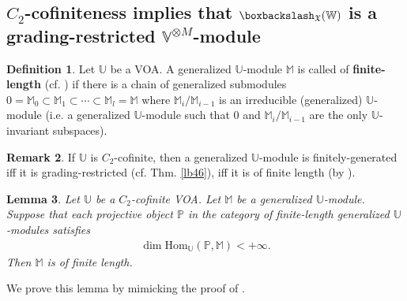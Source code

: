 \documentclass[11pt,b5paper,notitlepage]{article}
\theoremstyle{definition}
\newtheorem{df}{Definition}[section]
\newtheorem{rem}[df]{Remark}
\theoremstyle{plain}
\newtheorem{lm}[df]{Lemma}
\newcommand{\fk}{\mathfrak}
\newcommand{\Hom}{\mathrm{Hom}}
\newcommand{\Vbb}{\mathbb V}
\newcommand{\Ubb}{\mathbb U}
\newcommand{\Wbb}{\mathbb W}
\newcommand{\Mbb}{\mathbb M}
\newcommand{\Pbb}{\mathbb P}
\newcommand{\<}{\left\langle}
\renewcommand{\>}{\right\rangle}
\newcommand{\bbs}{\boxbackslash}
\numberwithin{equation}{section}
\begin{document}
\subsection{$C_2$-cofiniteness implies that $\bbs_{\fk X}(\Wbb)$ is a grading-restricted $\Vbb^{\otimes M}$-module}





\begin{df}
Let $\Ubb$ be a VOA. A generalized $\Ubb$-module $\Mbb$ is called of \textbf{finite-length} (cf. \cite[Def. 1.2]{Hua-projectivecover}) if there is a chain of generalized submodules $0=\Mbb_0\subset\Mbb_1\subset\cdots\subset\Mbb_l=\Mbb$ where $\Mbb_i/\Mbb_{i-1}$ is an irreducible (generalized) $\Ubb$-module (i.e. a generalized $\Ubb$-module such that $0$ and $\Mbb_i/\Mbb_{i-1}$ are the only $\Ubb$-invariant subspaces). %
\end{df}


\begin{rem}
If $\Ubb$ is $C_2$-cofinite, then a generalized $\Ubb$-module is finitely-generated iff it is grading-restricted (cf. Thm. \ref{lb46}), iff it is of finite length (by \cite[Prop. 4.3]{Hua-projectivecover}).
\end{rem}

\begin{lm}\label{lb54}
Let $\Ubb$ be a $C_2$-cofinite VOA. Let $\Mbb$ be a generalized $\Ubb$-module. Suppose that each projective object $\Pbb$ in the category of finite-length generalized $\Ubb$-modules satisfies
\begin{align*}
\dim \Hom_\Ubb(\Pbb,\Mbb)<+\infty.
\end{align*}
Then $\Mbb$ is of finite length.
\end{lm}

We prove this lemma by mimicking the proof of \cite[Thm. 4.5]{Hua-projectivecover}.
\end{document}

